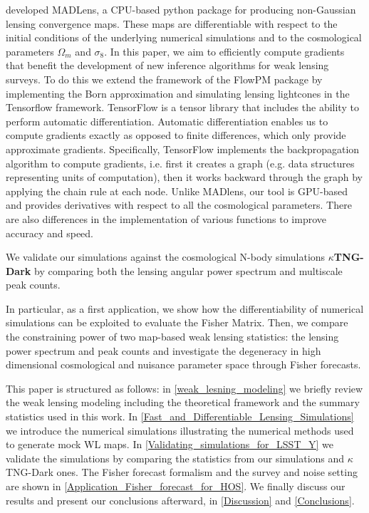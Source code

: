 \documentclass{aa}
\begin{document}
\cite{bohm2021madlens} developed MADLens, a CPU-based python package for producing non-Gaussian lensing convergence maps. These maps are differentiable with respect to the initial conditions of the underlying numerical simulations and to the cosmological parameters $\Omega_m$ and $\sigma_8$. In this paper,  we aim to efficiently compute gradients that benefit the development of new inference algorithms for weak lensing surveys. To do this we extend the framework of the FlowPM package \cite{modi2021flowpm} by implementing the Born approximation and simulating lensing lightcones in the Tensorflow framework. TensorFlow is a tensor library that includes the ability to perform automatic differentiation. Automatic differentiation enables us to compute gradients exactly as opposed to finite differences, which only provide approximate gradients. Specifically, TensorFlow implements the backpropagation algorithm to compute gradients, i.e. first it creates a graph (e.g. data structures representing units of computation), then it works backward through the graph by applying the chain rule at each node. Unlike MADlens, our tool is GPU-based and provides derivatives with respect to all the cosmological parameters. There are also differences in the implementation of various functions to improve accuracy and speed.

We validate our simulations against the cosmological N-body simulations \textbf{$\kappa$TNG-Dark} \citep{osato2021kappatng} by comparing both the lensing angular power spectrum and multiscale peak counts.

In particular, as a first application, we show how the differentiability of numerical simulations can be exploited to evaluate the Fisher Matrix. Then, we compare the constraining power of two map-based weak lensing statistics: the lensing power spectrum and peak counts and investigate the degeneracy in high dimensional cosmological and nuisance parameter space through Fisher forecasts. 

This paper is structured as follows: in \ref{weak_lesning_modeling} we briefly review the weak lensing modeling including the theoretical framework and the summary statistics used in this work. In \autoref{Fast_and_Differentiable_Lensing_Simulations} we introduce the numerical simulations illustrating the numerical methods used to generate mock WL maps. In \autoref{Validating_simulations_for_LSST_Y} we validate the simulations by comparing the statistics from our simulations and $\kappa$TNG-Dark ones.
The Fisher forecast formalism and the survey and noise setting are shown in \autoref{Application_Fisher_forecast_for_HOS}. We finally discuss our results and present our conclusions afterward, in \autoref{Discussion} and \autoref{Conclusions}.
\end{document}
